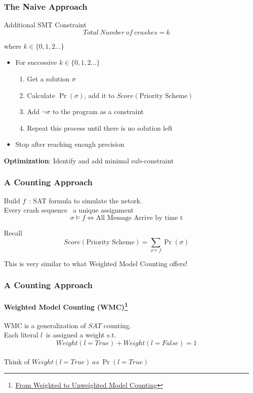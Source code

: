 \documentclass{beamer}
\begin{document}
\begin{frame}
\frametitle{The Naive Approach}
	\begin{block}{Additional SMT Constraint}
	\begin{equation}
		Total\ Number\ of\ crashes = k
	\end{equation} 
	\begin{flushright}
		where $k\in\{0,1,2...\}$
	\end{flushright}
	\end{block}
	\pause
	\begin{itemize}
	\item For successive $k\in\{0,1,2...\}$
	\begin{enumerate}
		\item Get a solution $\sigma$
		\item Calculate $\Pr(\sigma)$, add it to $Score(\text{Priority Scheme})$
		\item Add $\neg \sigma$ to the program as a constraint
		\item Repeat this process until there is no solution left
	\end{enumerate}
	\item Stop after reaching enough precision
	\end{itemize}
	\pause
	\textbf{Optimization}: 
	Identify and add minimal sub-constraint
\end{frame}


\begin{frame}
\frametitle{A Counting Approach}
	Build $ f $\ : SAT formula to simulate the netork.\\
	Every crash sequence \mapsto\ a unique assignment \sigma\  
	$$\sigma \vDash f \iff \text{All Message Arrive by time t}$$
	\vspace*{-15pt}
	\begin{block}{Recall}
	$$ Score(\text{Priority Scheme}) = \sum_{\sigma \vDash f}\Pr(\sigma) $$
	\end{block}
	\pause
	This is very similar to what Weighted Model Counting offers!
\end{frame}

\begin{frame}
\frametitle{A Counting Approach}
\framesubtitle{Weighted Model Counting (WMC)\footnote{\href{http://ijcai.org/Proceedings/15/Papers/103.pdf}{From Weighted to Unweighted Model Counting}}}

	WMC is a generalization of $SAT$ counting.\\
	Each literal $l$\ is assigned a weight s.t.\\
	$$Weight(l=True) + Weight(l=False) = 1$$\\
	\vspace*{20pt}
	Think of $Weight(l=True)\ as\ \Pr(l=True)$
\end{frame}
\end{document}
